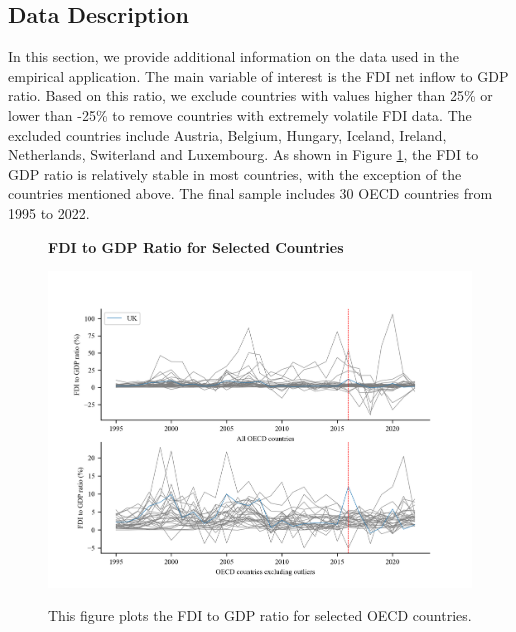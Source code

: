 \documentclass[12pt]{article}
\begin{document}
\subsection{Data Description}
\label{app: data}
In this section, we provide additional information on the data used in the empirical application. The main variable of interest is the FDI net inflow to GDP ratio. Based on this ratio, we exclude countries with values higher than 25\% or lower than -25\% to remove countries with extremely volatile FDI data. The excluded countries include Austria, Belgium, Hungary, Iceland, Ireland, Netherlands, Switerland and Luxembourg. As shown in Figure \ref{app: fdi_oecd}, the FDI to GDP ratio is relatively stable in most countries, with the exception of the countries mentioned above. The final sample includes 30 OECD countries from 1995 to 2022.

\begin{figure}[!ht]
    \centering
    \caption{\textbf{FDI to GDP Ratio for Selected Countries}}
    \includegraphics{figs/fdi_oecd.png}
    \label{app: fdi_oecd}
    \caption*{\footnotesize{This figure plots the FDI to GDP ratio for selected OECD countries.}}
    \end{figure}
\end{document}
